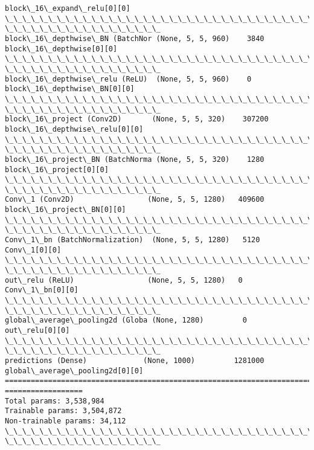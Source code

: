 \documentclass[11pt]{article}
\begin{document}
\begin{Verbatim}[commandchars=\\\{\}]
block\_16\_expand\_relu[0][0]
\_\_\_\_\_\_\_\_\_\_\_\_\_\_\_\_\_\_\_\_\_\_\_\_\_\_\_\_\_\_\_\_\_\_\_\_\_\_\_\_\_\_\_\_\_\_\_\_\_\_\_\_\_\_\_\_\_\_\_\_\_\_\_\_\_\_\_\_\_\_\_\_\_\_\_\_\_\_\_\_
\_\_\_\_\_\_\_\_\_\_\_\_\_\_\_\_\_\_
block\_16\_depthwise\_BN (BatchNor (None, 5, 5, 960)    3840
block\_16\_depthwise[0][0]
\_\_\_\_\_\_\_\_\_\_\_\_\_\_\_\_\_\_\_\_\_\_\_\_\_\_\_\_\_\_\_\_\_\_\_\_\_\_\_\_\_\_\_\_\_\_\_\_\_\_\_\_\_\_\_\_\_\_\_\_\_\_\_\_\_\_\_\_\_\_\_\_\_\_\_\_\_\_\_\_
\_\_\_\_\_\_\_\_\_\_\_\_\_\_\_\_\_\_
block\_16\_depthwise\_relu (ReLU)  (None, 5, 5, 960)    0
block\_16\_depthwise\_BN[0][0]
\_\_\_\_\_\_\_\_\_\_\_\_\_\_\_\_\_\_\_\_\_\_\_\_\_\_\_\_\_\_\_\_\_\_\_\_\_\_\_\_\_\_\_\_\_\_\_\_\_\_\_\_\_\_\_\_\_\_\_\_\_\_\_\_\_\_\_\_\_\_\_\_\_\_\_\_\_\_\_\_
\_\_\_\_\_\_\_\_\_\_\_\_\_\_\_\_\_\_
block\_16\_project (Conv2D)       (None, 5, 5, 320)    307200
block\_16\_depthwise\_relu[0][0]
\_\_\_\_\_\_\_\_\_\_\_\_\_\_\_\_\_\_\_\_\_\_\_\_\_\_\_\_\_\_\_\_\_\_\_\_\_\_\_\_\_\_\_\_\_\_\_\_\_\_\_\_\_\_\_\_\_\_\_\_\_\_\_\_\_\_\_\_\_\_\_\_\_\_\_\_\_\_\_\_
\_\_\_\_\_\_\_\_\_\_\_\_\_\_\_\_\_\_
block\_16\_project\_BN (BatchNorma (None, 5, 5, 320)    1280
block\_16\_project[0][0]
\_\_\_\_\_\_\_\_\_\_\_\_\_\_\_\_\_\_\_\_\_\_\_\_\_\_\_\_\_\_\_\_\_\_\_\_\_\_\_\_\_\_\_\_\_\_\_\_\_\_\_\_\_\_\_\_\_\_\_\_\_\_\_\_\_\_\_\_\_\_\_\_\_\_\_\_\_\_\_\_
\_\_\_\_\_\_\_\_\_\_\_\_\_\_\_\_\_\_
Conv\_1 (Conv2D)                 (None, 5, 5, 1280)   409600
block\_16\_project\_BN[0][0]
\_\_\_\_\_\_\_\_\_\_\_\_\_\_\_\_\_\_\_\_\_\_\_\_\_\_\_\_\_\_\_\_\_\_\_\_\_\_\_\_\_\_\_\_\_\_\_\_\_\_\_\_\_\_\_\_\_\_\_\_\_\_\_\_\_\_\_\_\_\_\_\_\_\_\_\_\_\_\_\_
\_\_\_\_\_\_\_\_\_\_\_\_\_\_\_\_\_\_
Conv\_1\_bn (BatchNormalization)  (None, 5, 5, 1280)   5120        Conv\_1[0][0]
\_\_\_\_\_\_\_\_\_\_\_\_\_\_\_\_\_\_\_\_\_\_\_\_\_\_\_\_\_\_\_\_\_\_\_\_\_\_\_\_\_\_\_\_\_\_\_\_\_\_\_\_\_\_\_\_\_\_\_\_\_\_\_\_\_\_\_\_\_\_\_\_\_\_\_\_\_\_\_\_
\_\_\_\_\_\_\_\_\_\_\_\_\_\_\_\_\_\_
out\_relu (ReLU)                 (None, 5, 5, 1280)   0           Conv\_1\_bn[0][0]
\_\_\_\_\_\_\_\_\_\_\_\_\_\_\_\_\_\_\_\_\_\_\_\_\_\_\_\_\_\_\_\_\_\_\_\_\_\_\_\_\_\_\_\_\_\_\_\_\_\_\_\_\_\_\_\_\_\_\_\_\_\_\_\_\_\_\_\_\_\_\_\_\_\_\_\_\_\_\_\_
\_\_\_\_\_\_\_\_\_\_\_\_\_\_\_\_\_\_
global\_average\_pooling2d (Globa (None, 1280)         0           out\_relu[0][0]
\_\_\_\_\_\_\_\_\_\_\_\_\_\_\_\_\_\_\_\_\_\_\_\_\_\_\_\_\_\_\_\_\_\_\_\_\_\_\_\_\_\_\_\_\_\_\_\_\_\_\_\_\_\_\_\_\_\_\_\_\_\_\_\_\_\_\_\_\_\_\_\_\_\_\_\_\_\_\_\_
\_\_\_\_\_\_\_\_\_\_\_\_\_\_\_\_\_\_
predictions (Dense)             (None, 1000)         1281000
global\_average\_pooling2d[0][0]
================================================================================
==================
Total params: 3,538,984
Trainable params: 3,504,872
Non-trainable params: 34,112
\_\_\_\_\_\_\_\_\_\_\_\_\_\_\_\_\_\_\_\_\_\_\_\_\_\_\_\_\_\_\_\_\_\_\_\_\_\_\_\_\_\_\_\_\_\_\_\_\_\_\_\_\_\_\_\_\_\_\_\_\_\_\_\_\_\_\_\_\_\_\_\_\_\_\_\_\_\_\_\_
\_\_\_\_\_\_\_\_\_\_\_\_\_\_\_\_\_\_
    \end{Verbatim}
\end{document}
